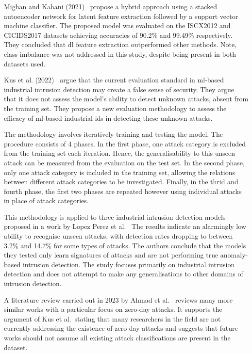 Mighan and Kahani (2021)~\cite{Mighan} propose a hybrid approach using a
stacked autoencoder network for latent feature extraction followed by a support
vector machine classifier. The proposed model was evaluated on the ISCX2012 and
CICIDS2017 datasets achieving accuracies of 90.2\% and 99.49\% respectively.
They concluded that \gls{dl} feature extraction outperformed other methods.
Note, class imbalance was not addressed in this study, despite being present in
both datasets used.

Kus et al. (2022)~\cite{Kus} argue that the current evaluation standard in
\gls{ml}-based industrial intrusion detection may create a false sense of
security. They argue that it does not assess the model's ability to detect
unknown attacks, absent from the training set. They propose a new evaluation
methodology to assess the efficacy of \gls{ml}-based industrial \gls{ids} in
detecting these unknown attacks.

The methodology involves iteratively training and testing the model. The
procedure consists of 4 phases. In the first phase, one attack category is
excluded from the training set each iteration. Hence, the generalisability to
this unseen attack can be measured from the evaluation on the test set. In the
second phase, only one attack category is included in the training set,
allowing the relations between different attack categories to be investigated.
Finally, in the thrid and fourth phase, the first two phases are repeated
however using individual attacks in place of attack categories.

This methodology is applied to three industrial intrusion detection models
proposed in a work by Lopez Perez et al.~\cite{Perez} The results indicate an
alarmingly low ability to recognise unseen attacks, with detection rates
dropping to between 3.2\% and 14.7\% for some types of attacks. The authors
conclude that the models they tested only learn signatures of attacks and are
not performing true anomaly-based intrusion detection. The study focuses
primarily on industrial intrusion detection and does not attempt to make any
generalisations to other domains of intrusion detection.

A literature review carried out in 2023 by Ahmad et al.~\cite{zero-day}
reviews many more similar works with a particular focus on zero-day attacks. It
supports the argument of Kus et al.\ stating that many researchers in the field
are not currently addressing the existence of zero-day attacks and suggests
that future works should not assume all existing attack classifications are
present in the dataset.
